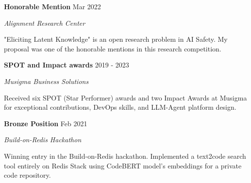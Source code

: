 \documentclass[fontsize=11pt]{article}
\newcommand{\sepspace}{\vspace*{1em}}
\newcommand{\AwardEntry}[4]{
    \noindent \textbf{#1} \hfill {#2} \par
    \noindent \textit{#3} \par
    \noindent \small #4
    \normalsize \par}
\begin{document}
\AwardEntry{Honorable Mention}{Mar 2022}{Alignment Research Center}
{"Eliciting Latent Knowledge" is an open research problem in AI Safety. My proposal was one of the honorable mentions in this research competition.}

\AwardEntry{SPOT and Impact awards}{2019 - 2023}{Musigma Business Solutions}
{Received six SPOT (Star Performer) awards and two Impact Awards at Musigma for exceptional contributions, DevOps skills, and LLM-Agent platform design.}

\sepspace

\AwardEntry{Bronze Position}{Feb 2021}{Build-on-Redis Hackathon}
{Winning entry in the Build-on-Redis hackathon. Implemented a text2code search tool entirely on Redis Stack using CodeBERT model's embeddings for a private code repository.}
\end{document}
